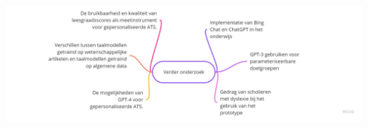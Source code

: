 \documentclass[a0,portrait]{hogent-poster}
\begin{document}
\begin{multicols}{2}
\begin{center}
	\captionsetup{type=figure}
	\includegraphics[width=1.0\linewidth]{figures/verder-onderzoek.jpg}
	\label{img:verder-onderzoek}
\end{center}

\end{multicols}
\end{document}
